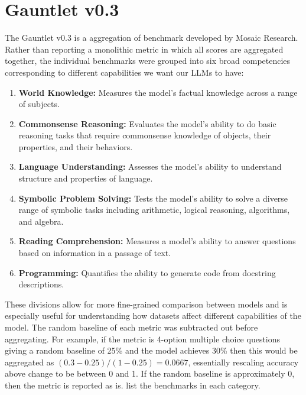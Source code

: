 \documentclass[10pt]{article} %
\begin{document}
\newpage




\newpage

\appendix

\section{Gauntlet v0.3}
\label{sec:gauntlet}

The Gauntlet v0.3 is a aggregation of benchmark developed by Mosaic Research. Rather than reporting a monolithic metric in which all scores are aggregated together, the individual benchmarks were grouped into six broad competencies corresponding to different capabilities we want our LLMs to have:  

\begin{enumerate}
    \item \textbf{World Knowledge:} Measures the model's factual knowledge across a range of subjects.
    \item \textbf{Commonsense Reasoning:} Evaluates the model's ability to do basic reasoning tasks that require commonsense knowledge of objects, their properties, and their behaviors.
    \item \textbf{Language Understanding:} Assesses the model's ability to understand structure and properties of language.
    \item \textbf{Symbolic Problem Solving:} Tests the model's ability to solve a diverse range of symbolic tasks including arithmetic, logical reasoning, algorithms, and algebra.
    \item \textbf{Reading Comprehension:} Measures a model's ability to answer questions based on information in a passage of text.
    \item \textbf{Programming:} Quantifies the ability to generate code from docstring descriptions. 
\end{enumerate}

These divisions allow for more fine-grained comparison between models and is especially useful for understanding how datasets affect different capabilities of the model.  The random baseline of each metric was subtracted out before aggregating. 
For example, if the metric is 4-option multiple choice questions giving a random baseline of 25\% and the model achieves 30\% then this would be aggregated as $(0.3-0.25)/(1-0.25) = 0.0667$, essentially rescaling accuracy above change to be between 0 and 1.  If the random baseline is approximately 0, then the metric is reported as is.  list the benchmarks in each category.
\end{document}
